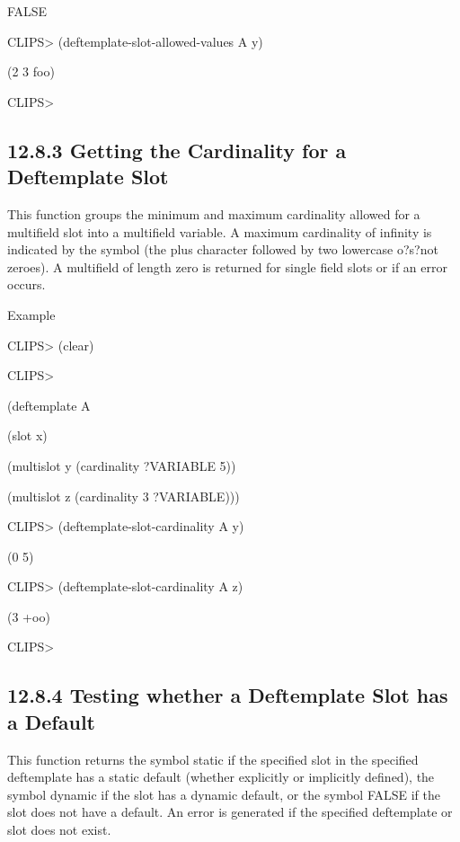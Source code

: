\documentclass[letterpaper,10pt,english]{sphinxmanual}
\begin{document}
FALSE

CLIPS\textgreater{} (deftemplate-slot-allowed-values A y)

(2 3 foo)

CLIPS\textgreater{}


\subsection{12.8.3 Getting the Cardinality for a Deftemplate Slot}
\label{\detokenize{actions:getting-the-cardinality-for-a-deftemplate-slot}}
This function groups the minimum and maximum cardinality allowed for a
multifield slot into a multifield variable. A maximum cardinality of
infinity is indicated by the symbol  (the plus character followed
by two lowercase o?s?not zeroes). A multifield of length zero is
returned for single field slots or if an error occurs.


\begin{sphinxVerbatim}[commandchars=\\\{\}]
  
\end{sphinxVerbatim}

Example

CLIPS\textgreater{} (clear)

CLIPS\textgreater{}

(deftemplate A

(slot x)

(multislot y (cardinality ?VARIABLE 5))

(multislot z (cardinality 3 ?VARIABLE)))

CLIPS\textgreater{} (deftemplate-slot-cardinality A y)

(0 5)

CLIPS\textgreater{} (deftemplate-slot-cardinality A z)

(3 +oo)

CLIPS\textgreater{}


\subsection{12.8.4 Testing whether a Deftemplate Slot has a Default}
\label{\detokenize{actions:testing-whether-a-deftemplate-slot-has-a-default}}
This function returns the symbol static if the specified slot in the
specified deftemplate has a static default (whether explicitly or
implicitly defined), the symbol dynamic if the slot has a dynamic
default, or the symbol FALSE if the slot does not have a default. An
error is generated if the specified deftemplate or slot does not exist.
\end{document}

